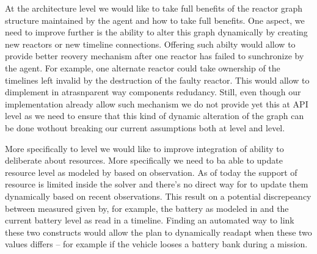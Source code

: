At the architecture level we would like to take full benefits of the
reactor graph structure maintained by the agent and how to take full
benefits. One aspect, we need to improve further is the ability to
alter this graph dynamically by creating new reactors or new timeline
connections. Offering such abilty would allow to provide better
reovery mechanism after one reactor has failed to sunchronize by the 
agent. For example, one alternate reactor could take ownership of the
timelines left invalid by the destruction of the faulty reactor. This
would allow to dimplement in atrasnparent way components
redudancy. Still, even though our implementation already allow such
mechanism we do not provide yet this at \rx API level as we need to
ensure that this kind of dynamic alteration of the graph can be done
wothout breaking our current assumptions both at \rx level and \eu
level.

More specifically to \eu level we would like to improve \rx
integration of \eu ability to deliberate about resources. More
specifically we need to ba able to update resource level as 
modeled by \eu based on \rx observation.  As of today the 
support of resource is limited inside the \eu solver and there's no
direct way for \rx to update them dynamically based on recent
observations. This result on a potential discrepeancy between measured
given by, for example, the battery as modeled in \eu and the current
battery level as read in a \rx timeline. Finding an automated way to
link these two constructs would allow the plan to dynamically readapt
when these two values differs -- for example if the vehicle looses a
battery bank during a mission.








